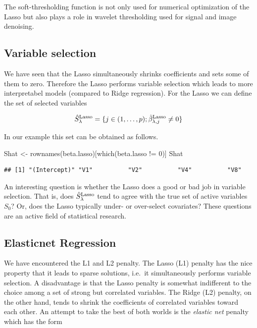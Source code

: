 \documentclass[
]{book}
\newenvironment{Shaded}{\begin{snugshade}}{\end{snugshade}}
\newcommand{\DecValTok}[1]{\textcolor[rgb]{0.00,0.00,0.81}{#1}}
\newcommand{\FunctionTok}[1]{\textcolor[rgb]{0.00,0.00,0.00}{#1}}
\newcommand{\NormalTok}[1]{#1}
\newcommand{\OtherTok}[1]{\textcolor[rgb]{0.56,0.35,0.01}{#1}}
\newcommand{\SpecialCharTok}[1]{\textcolor[rgb]{0.00,0.00,0.00}{#1}}
\begin{document}
The soft-thresholding function is not only used for numerical optimization of the Lasso but also plays a role in wavelet thresholding used for signal and image denoising.

\hypertarget{variable-selection}{%
\subsection{Variable selection}\label{variable-selection}}

We have seen that the Lasso simultaneously shrinks coefficients and sets some of them to zero. Therefore the Lasso performs variable selection which leads to more interpretabel models (compared to Ridge regression). For the Lasso we can define the set of selected variables

\[\hat S^{\rm Lasso}_{\lambda}=\{j\in (1,\ldots,p); \hat\beta^{\rm Lasso}_{\lambda,j}\neq 0\}\]

In our example this set can be obtained as follows.

\begin{Shaded}
\begin{Highlighting}[]
\NormalTok{Shat }\OtherTok{\textless{}{-}} \FunctionTok{rownames}\NormalTok{(beta.lasso)[}\FunctionTok{which}\NormalTok{(beta.lasso }\SpecialCharTok{!=} \DecValTok{0}\NormalTok{)]}
\NormalTok{Shat}
\end{Highlighting}
\end{Shaded}

\begin{verbatim}
## [1] "(Intercept)" "V1"          "V2"          "V4"          "V8"
\end{verbatim}

An interesting question is whether the Lasso does a good or bad job in variable selection. That is, does \(\hat S^{\rm Lasso}_{\lambda}\) tend to agree with the true set of active variables \(S_0\)? Or, does the Lasso typically under- or over-select covariates? These questions are an active field of statistical research.

\hypertarget{elasticnet-regression}{%
\subsection{Elasticnet Regression}\label{elasticnet-regression}}

We have encountered the L1 and L2 penalty. The Lasso (L1) penalty
has the nice property that it leads to sparse solutions, i.e.~it simultaneously performs variable selection. A disadvantage is that the Lasso penalty is somewhat indifferent to the choice among a set of strong but correlated variables. The Ridge (L2) penalty, on the other hand, tends
to shrink the coefficients of correlated variables toward each other. An attempt to take the best of both worlds is the \emph{elastic net} penalty which has the form
\end{document}
